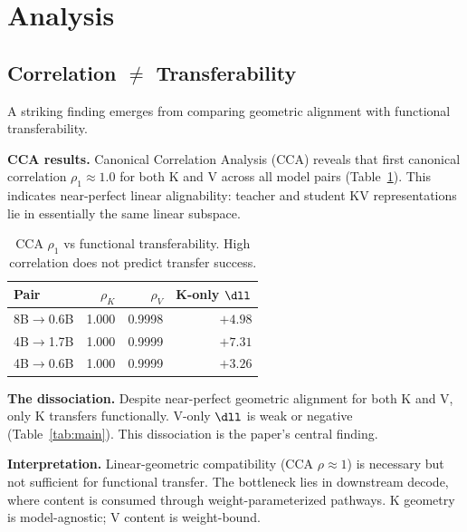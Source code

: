 
\section{Analysis}
\label{sec:analysis}

\subsection{Correlation $\neq$ Transferability}

A striking finding emerges from comparing geometric alignment
with functional transferability.

\textbf{CCA results.}
Canonical Correlation Analysis (CCA) reveals that
first canonical correlation $\rho_1 \approx 1.0$ for both K and V
across all model pairs (Table~\ref{tab:cca}).
This indicates near-perfect linear alignability:
teacher and student KV representations lie in essentially
the same linear subspace.

\begin{table}[t]
\centering
\caption{CCA $\rho_1$ vs functional transferability.
High correlation does not predict transfer success.}
\label{tab:cca}
\begin{tabular}{lrrr}
\toprule
Pair & $\rho_K$ & $\rho_V$ & K-only $\dll$ \\
\midrule
8B$\to$0.6B & 1.000 & 0.9998 & $+4.98$ \\
4B$\to$1.7B & 1.000 & 0.9999 & $+7.31$ \\
4B$\to$0.6B & 1.000 & 0.9999 & $+3.26$ \\
\bottomrule
\end{tabular}
\end{table}

\textbf{The dissociation.}
Despite near-perfect geometric alignment for both K and V,
only K transfers functionally.
V-only $\dll$ is weak or negative (Table~\ref{tab:main}).
This dissociation is the paper's central finding.

\textbf{Interpretation.}
Linear-geometric compatibility (CCA $\rho \approx 1$)
is necessary but not sufficient for functional transfer.
The bottleneck lies in downstream decode,
where content is consumed through weight-parameterized pathways.
K geometry is model-agnostic; V content is weight-bound.


